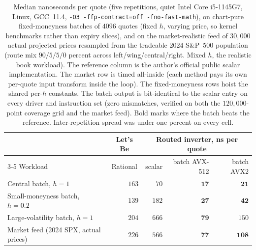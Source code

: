 \documentclass[11pt]{article}
\begin{document}
\begin{table}[t]
\centering
\small
\begin{tabular}{l r r r r}
\toprule
 & \multicolumn{1}{c}{Let's Be} & \multicolumn{3}{c}{Routed inverter, ns per quote} \\
\cmidrule(lr){3-5}
Workload & \multicolumn{1}{c}{Rational} & scalar & batch AVX-512 & batch AVX2 \\
\midrule
Central batch, $h{=}1$              & $163$ & $70$   & $\mathbf{17}$  & $\mathbf{21}$  \\
Small-moneyness batch, $h{=}0.2$    & $139$ & $182$  & $\mathbf{27}$  & $\mathbf{42}$  \\
Large-volatility batch, $h{=}1$     & $204$ & $666$  & $\mathbf{79}$  & $150$ \\
Market feed (2024 SPX, actual prices)& $226$ & $566$ & $\mathbf{77}$  & $\mathbf{108}$ \\
\bottomrule
\end{tabular}
\caption{Median nanoseconds per quote (five repetitions, quiet Intel Core i5-1145G7, Linux, GCC~11.4, \texttt{-O3 -ffp-contract=off -fno-fast-math}), on chart-pure fixed-moneyness batches of $4096$ quotes (fixed $h$, varying price, so kernel benchmarks rather than expiry slices), and on the market-realistic feed of $30{,}000$ actual projected prices resampled from the tradeable 2024 S\&P~500 population (route mix $90/5/5/0$ percent across left/wing/central/right. Mixed $h$, the realistic book workload). The reference column is the author's official public scalar implementation. The market row is timed all-inside (each method pays its own per-quote input transform inside the loop). The fixed-moneyness rows hoist the shared per-$h$ constants. The batch output is bit-identical to the scalar entry on every driver and instruction set (zero mismatches, verified on both the $120{,}000$-point coverage grid and the market feed). Bold marks where the batch beats the reference. Inter-repetition spread was under one percent on every cell.}
\label{tab:timing}
\end{table}
\end{document}
